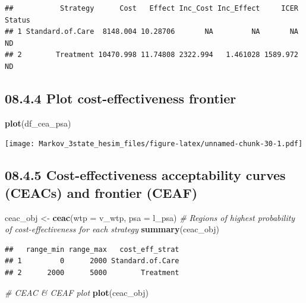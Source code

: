 \documentclass[
]{article}
\newenvironment{Shaded}{\begin{snugshade}}{\end{snugshade}}
\newcommand{\CommentTok}[1]{\textcolor[rgb]{0.56,0.35,0.01}{\textit{#1}}}
\newcommand{\DataTypeTok}[1]{\textcolor[rgb]{0.13,0.29,0.53}{#1}}
\newcommand{\KeywordTok}[1]{\textcolor[rgb]{0.13,0.29,0.53}{\textbf{#1}}}
\newcommand{\NormalTok}[1]{#1}
\newcommand{\StringTok}[1]{\textcolor[rgb]{0.31,0.60,0.02}{#1}}
\begin{document}
\begin{verbatim}
##           Strategy      Cost   Effect Inc_Cost Inc_Effect     ICER Status
## 1 Standard.of.Care  8148.004 10.28706       NA         NA       NA     ND
## 2        Treatment 10470.998 11.74808 2322.994   1.461028 1589.972     ND
\end{verbatim}

\hypertarget{plot-cost-effectiveness-frontier}{%
\subsection{08.4.4 Plot cost-effectiveness
frontier}\label{plot-cost-effectiveness-frontier}}

\begin{Shaded}
\begin{Highlighting}[]
\KeywordTok{plot}\NormalTok{(df_cea_psa)}
\end{Highlighting}
\end{Shaded}

\texttt{[image: Markov\_3state\_hesim\_files/figure-latex/unnamed-chunk-30-1.pdf]}

\hypertarget{cost-effectiveness-acceptability-curves-ceacs-and-frontier-ceaf}{%
\subsection{08.4.5 Cost-effectiveness acceptability curves (CEACs) and
frontier
(CEAF)}\label{cost-effectiveness-acceptability-curves-ceacs-and-frontier-ceaf}}

\begin{Shaded}
\begin{Highlighting}[]
\NormalTok{ceac_obj <-}\StringTok{ }\KeywordTok{ceac}\NormalTok{(}\DataTypeTok{wtp =}\NormalTok{ v_wtp, }\DataTypeTok{psa =}\NormalTok{ l_psa)}
\CommentTok{# Regions of highest probability of cost-effectiveness for each strategy}
\KeywordTok{summary}\NormalTok{(ceac_obj)}
\end{Highlighting}
\end{Shaded}

\begin{verbatim}
##   range_min range_max   cost_eff_strat
## 1         0      2000 Standard.of.Care
## 2      2000      5000        Treatment
\end{verbatim}

\begin{Shaded}
\begin{Highlighting}[]
\CommentTok{# CEAC & CEAF plot}
\KeywordTok{plot}\NormalTok{(ceac_obj)}
\end{Highlighting}
\end{Shaded}
\end{document}
